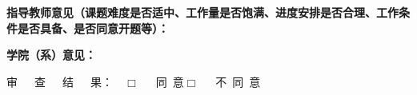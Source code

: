 \newpage

\begin{SecBox}
    \textbf{指导教师意见（课题难度是否适中、工作量是否饱满、进度安排是否合理、工作条件是否具备、是否同意开题等）：}

    \vspace{19em}


    \vspace{1em}


    \vspace{4em}
\end{SecBox}

\begin{SecBox}
    \textbf{学院（系）意见：}

    \vspace{8em}

    审\ \ \ 查\ \ \ 结\ \ \ 果：\ \ $\Box$\ \ \ 同\ 意\qquad $\Box$\ \ \ 不\ 同\ 意

    \vspace{3em}
    

    \vspace{1em}

\end{SecBox}
